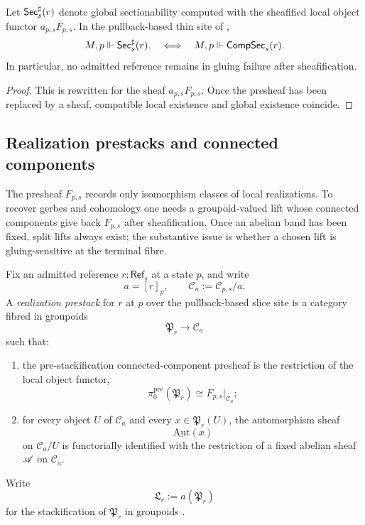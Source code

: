 \begin{corollary}\label{cor:sheafification-removes-glue}
Let $\mathsf{Sec}_s^{\sharp}(r)$ denote global sectionability computed with the sheafified local object functor $a_{p,s}F_{p,s}$. In the pullback-based thin site of ,
\[
M,p\Vdash \mathsf{Sec}_s^{\sharp}(r).
\quad\Longleftrightarrow\quad
M,p\Vdash \mathsf{CompSec}_s(r).
\]
In particular, no admitted reference remains in gluing failure after sheafification.
\end{corollary}

\begin{proof}
This is  rewritten for the sheaf $a_{p,s}F_{p,s}$. Once the presheaf has been replaced by a sheaf, compatible local existence and global existence coincide.
\end{proof}

\subsection{Realization prestacks and connected components}

The presheaf $F_{p,s}$ records only isomorphism classes of local realizations. To recover gerbes and cohomology one needs a groupoid-valued lift whose connected components give back $F_{p,s}$ after sheafification. Once an abelian band has been fixed, split lifts always exist; the substantive issue is whether a chosen lift is gluing-sensitive at the terminal fibre.

\begin{definition}\label{def:realization-prestack}
Fix an admitted reference $r:\mathsf{Ref}_s$ at a state $p$, and write
\[
a=[r]_p,
\qquad
\mathcal C_a:=\mathcal C_{p,s}/a.
\]
A \emph{realization prestack} for $r$ at $p$ over the pullback-based slice site is a category fibred in groupoids
\[
\mathfrak P_r\to \mathcal C_a
\]
such that:
\begin{enumerate}[label=(\roman*),nosep]
\item the pre-stackification connected-component presheaf is the restriction of the local object functor,
\[
\pi_0^{\mathrm{pre}}(\mathfrak P_r)\cong F_{p,s}|_{\mathcal C_a};
\]
\item for every object $U$ of $\mathcal C_a$ and every $x\in \mathfrak P_r(U)$, the automorphism sheaf
\[
\underline{\mathrm{Aut}}(x)
\]
on $\mathcal C_a/U$ is functorially identified with the restriction of a fixed abelian sheaf $\mathscr{A}$ on $\mathcal C_a$.
\end{enumerate}
Write
\[
\mathfrak L_r:=a(\mathfrak P_r)
\]
for the stackification of $\mathfrak P_r$ in groupoids \cite[Tag 02ZP]{StacksProject}.
\end{definition}

